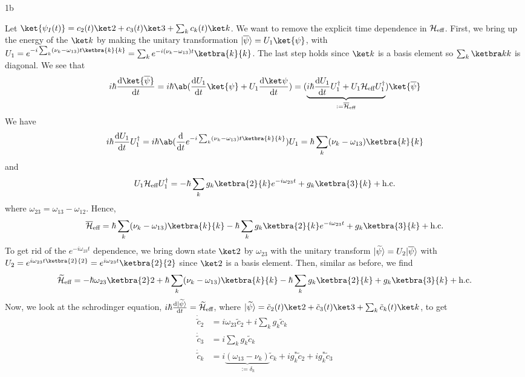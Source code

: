 \documentclass[12pt]{article}
\begin{document}
\begin{exc}{1b}
    
\end{exc}
\begin{ans}
    Let $\ket{\psi_I(t)} = c_2(t) \ket 2 + c_3(t) \ket 3 + \sum_k c_k(t) \ket k$. We want to remove the explicit time dependence in $\mathcal{H}_{\text{eff}}$. First, we bring up the energy of the $\ket k$ by making the unitary transformation $\uket{\overline \psi} = U_1 \ket{\psi}$, with $U_1 = e^{-i \sum_k (\nu_k - \omega_{13})t\ketbra{k}{k}} = \sum_k e^{-i(\nu_k - \omega_{13})t}\ketbra{k}{k}$. The last step holds since $\ket k$ is a basis element so $\sum_k \ketbra k k$ is diagonal. We see that 
    \[i\hbar \odv{\ket{\overline \psi}}{t} = i\hbar \ab(\odv{U_1}{t} \ket{\psi} + U_1 \odv{\ket\psi}{t}) = (\underbrace{i\hbar \odv{U_1}{t} U_1^{\dagger} + U_1 \HH_{\text{eff}}U_1^{\dagger}}_{:= \overline{\HH}_{\text{eff}}})\ket{\overline \psi}\]
    We have 
    \[i\hbar \odv{U_1}{t} U_1^{\dagger} = i\hbar \ab(\odv{}{t} e^{-i\sum_k(\nu_k - \omega_{13})t \ketbra{k}{k}})U_1 = \hbar \sum_k(\nu_k - \omega_{13})\ketbra{k}{k} \]
    and 
    \[U_1 \HH_{\text{eff}}U_1^\dagger = -\hbar \sum_k g_k \ketbra{2}{k} e^{-i\omega_{23}t} + g_k \ketbra{3}{k} + \text{h.c.}\]
    where $\omega_{23} = \omega_{13} - \omega_{12}$. Hence, 
    \[\tub{\overline \HH}{eff} = \hbar \sum_k(\nu_k - \omega_{13})\ketbra{k}{k} -\hbar \sum_k g_k \ketbra{2}{k} e^{-i\omega_{23}t} + g_k \ketbra{3}{k} + \text{h.c.}\]
    To get rid of the $e^{-i\omega_{23}t}$ dependence, we bring down state $\ket 2$ by $\omega_{23}$ with the unitary transform $\vert \widetilde{\psi} \rangle = U_2 \vert \overline{\psi} \rangle$ with $U_2 = e^{i\omega_{23}t \ketbra{2}{2}} = e^{i\omega_{23}t}\ketbra{2}{2}$ since $\ket 2$ is a basis element. Then, similar as before, we find 
    \[\tub{\widetilde \HH}{eff} = -\hbar \omega_{23} \ketbra{2}2 +\hbar \sum_k(\nu_k - \omega_{13})\ketbra{k}{k} -\hbar \sum_k g_k \ketbra{2}{k} + g_k \ketbra{3}{k} + \text{h.c.}\]
    Now, we look at the schrodinger equation, $i\hbar \odv{\uket{\widetilde \psi}}{t} = \tub{\widetilde{\HH}}{eff}$, where $\uket{\widetilde{\psi}} = \tilde c_2(t) \ket  2 + \tilde c_3(t) \ket 3 + \sum_k \tilde c_k(t) \ket k$, to get 
    \begin{align*}
        \dot{\tilde c}_2 &=  i\omega_{23} \tilde c_2 + i\sum_k g_k \tilde c_k  \\
        \dot{\tilde c}_3 &=  i\sum_k g_k \tilde c_k \\ 
        \dot{\tilde c}_k &= i\underbrace{(\omega_{13} - \nu_k)}_{:= \delta_k}\tilde c_k + ig_k^* \tilde c_2 + ig_k^* \tilde c_3

\end{align*}
\end{ans}
\end{document}
